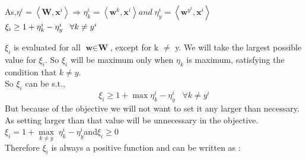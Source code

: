 \documentclass[a4paper,11pt]{article}
\begin{document}
\begin{mlsolution}
As,\begin{math} \eta ^{i} = \left \langle \textbf{W}, \textbf{x}^{i} \right \rangle \Rightarrow \eta_{k} ^{i} = \left \langle \textbf{w}^{k}, \textbf{x}^{i} \right \rangle  and \;\eta_{y} ^{i} = \left \langle \textbf{w}^{y^{i}}, \textbf{x}^{i} \right \rangle \end{math}\\

\begin{math}
\xi_{i} \geq 1 + \eta_{k}^{i} - \eta_{y} ^{i} \;\;\; \forall k\neq y^{i} \\
\end{math}

\begin{math}
\xi_{i}
\end{math} is evaluated for all \begin{math}\textbf{w} \in \textbf{W}\end{math}, except for k \begin{math}\neq\end{math} y. We will take the largest possible value for \begin{math}\xi_{i}\end{math}. So \begin{math}\xi_{i}\end{math} will be maximum only when \begin{math}\eta_{k}\end{math} is maximum, satisfying the condition that \begin{math}k \neq y\end{math}.\\

So \begin{math}\xi_{i}\end{math} can be s.t., \[
\xi_{i} \geq 1 + \max \eta_{k}^{i} - \eta_{y} ^{i} \;\;\; \forall k\neq y^{i} 
\]
But because of the objective we will not want to set it any larger than necessary. As setting larger than that value will be unnecessary in the objective.\\

\begin{math}\xi_{i} =   1 + \underset{k\neq y}{\max} \;\eta_{k}^{i} - \eta_{y} ^{i}  \end{math}\;and\;\begin{math} \xi_{i}\geq 0\end{math}\\

Therefore \begin{math} \xi_{i}\end{math} is always a positive function and can be written as :\\


\end{mlsolution}
\end{document}
